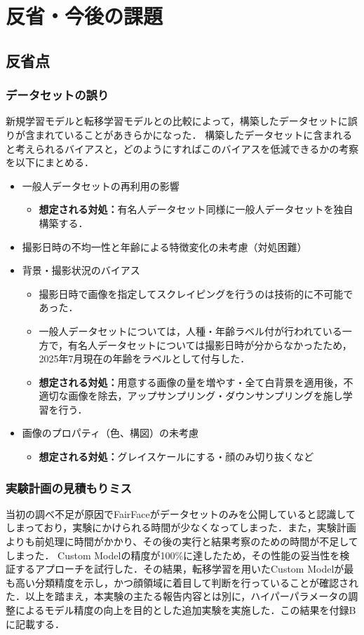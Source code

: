 \documentclass[a4paper,11pt,titlepage]{jsarticle}
\begin{document}
\section{反省・今後の課題}

\subsection{反省点}
\subsubsection*{データセットの誤り}
新規学習モデルと転移学習モデルとの比較によって，構築したデータセットに誤りが含まれていることがあきらかになった．
構築したデータセットに含まれると考えられるバイアスと，どのようにすればこのバイアスを低減できるかの考察を以下にまとめる．
\begin{itemize}
	\item 一般人データセットの再利用の影響
		\begin{itemize}
			\item \textbf{想定される対処：}有名人データセット同様に一般人データセットを独自構築する．
		\end{itemize}
	\item  撮影日時の不均一性と年齢による特徴変化の未考慮（対処困難）
	\item 背景・撮影状況のバイアス
		\begin{itemize}
			\item 撮影日時で画像を指定してスクレイピングを行うのは技術的に不可能であった．
			\item 一般人データセットについては，人種・年齢ラベル付が行われている一方で，有名人データセットについては撮影日時が分からなかったため，2025年7月現在の年齢をラベルとして付与した．
			\item \textbf{想定される対処：}用意する画像の量を増やす・全て白背景を適用後，不適切な画像を除去，アップサンプリング・ダウンサンプリングを施し学習を行う．
		\end{itemize}
	\item 画像のプロパティ（色、構図）の未考慮
		\begin{itemize}
			\item \textbf{想定される対処：}グレイスケールにする・顔のみ切り抜くなど
		\end{itemize}
\end{itemize}

\subsubsection*{実験計画の見積もりミス}
当初の調べ不足が原因でFairFaceがデータセットのみを公開していると認識してしまっており，実験にかけられる時間が少なくなってしまった．また，実験計画よりも前処理に時間がかかり、その後の実行と結果考察のための時間が不足してしまった．
Custom Modelの精度が100\%に達したため，その性能の妥当性を検証するアプローチを試行した．その結果，転移学習を用いたCustom Modelが最も高い分類精度を示し，かつ顔領域に着目して判断を行っていることが確認された．以上を踏まえ，本実験の主たる報告内容とは別に，ハイパーパラメータの調整によるモデル精度の向上を目的とした追加実験を実施した．この結果を付録Bに記載する．
\end{document}
